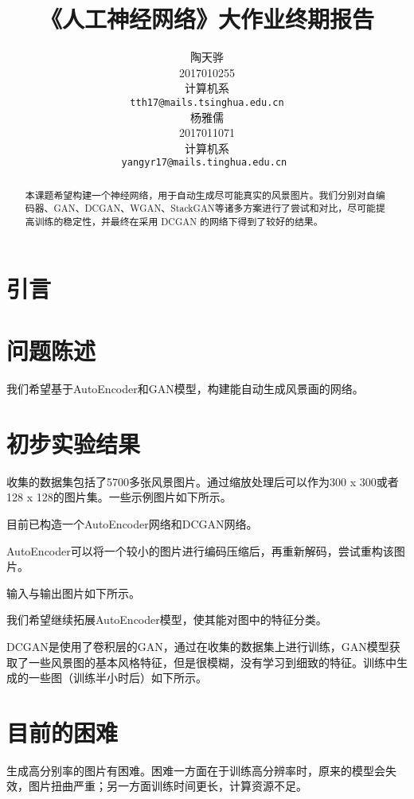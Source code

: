 \documentclass{article}
\title{《人工神经网络》大作业终期报告}
\author{%
  陶天骅 \\
  2017010255 \\
  计算机系 \\
  \texttt{tth17@mails.tsinghua.edu.cn} \\
  \And
  杨雅儒\\
  2017011071 \\
  计算机系 \\
  \texttt{yangyr17@mails.tinghua.edu.cn
  } \\
}
\begin{document}
\begin{CJK*}{UTF8}{gbsn}
\maketitle


\begin{abstract}

本课题希望构建一个神经网络，用于自动生成尽可能真实的风景图片。我们分别对自编码器、GAN、DCGAN、WGAN、StackGAN等诸多方案进行了尝试和对比，尽可能提高训练的稳定性，并最终在采用 DCGAN 的网络下得到了较好的结果。

\end{abstract}

\section{引言}

\section{问题陈述}

我们希望基于AutoEncoder和GAN模型，构建能自动生成风景画的网络。

\section{初步实验结果}

收集的数据集包括了5700多张风景图片。通过缩放处理后可以作为300 x 300或者128 x 128的图片集。一些示例图片如下所示。


目前已构造一个AutoEncoder网络和DCGAN网络。

AutoEncoder可以将一个较小的图片进行编码压缩后，再重新解码，尝试重构该图片。

输入与输出图片如下所示。


我们希望继续拓展AutoEncoder模型，使其能对图中的特征分类。

DCGAN是使用了卷积层的GAN，通过在收集的数据集上进行训练，GAN模型获取了一些风景图的基本风格特征，但是很模糊，没有学习到细致的特征。训练中生成的一些图（训练半小时后）如下所示。


\section{目前的困难}

生成高分别率的图片有困难。困难一方面在于训练高分辨率时，原来的模型会失效，图片扭曲严重；另一方面训练时间更长，计算资源不足。


\end{CJK*}
\end{document}
